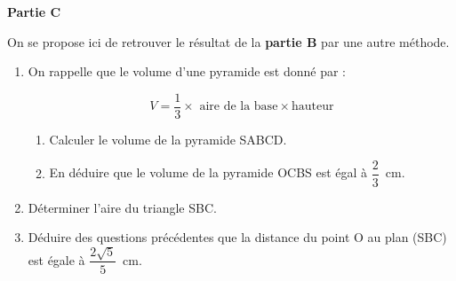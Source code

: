 \textbf{Partie C}

On se propose ici de retrouver le résultat de la \textbf{partie B} par une autre méthode.

\begin{enumerate}
\item On rappelle que le volume d'une pyramide est donné par :

\[V =\dfrac{1}{3} \times \text{ aire de la base} \times \text{hauteur}\]

	\begin{enumerate}
		\item Calculer le volume de la pyramide SABCD.
		\item En déduire que le volume de la pyramide OCBS est égal à $\dfrac{2}{3}$~cm.
	\end{enumerate}
\item Déterminer l'aire du triangle SBC.
\item Déduire des questions précédentes que la distance du point O au plan (SBC) est égale à $\dfrac{2 \sqrt{5}}{5}$~cm.
\end{enumerate}


